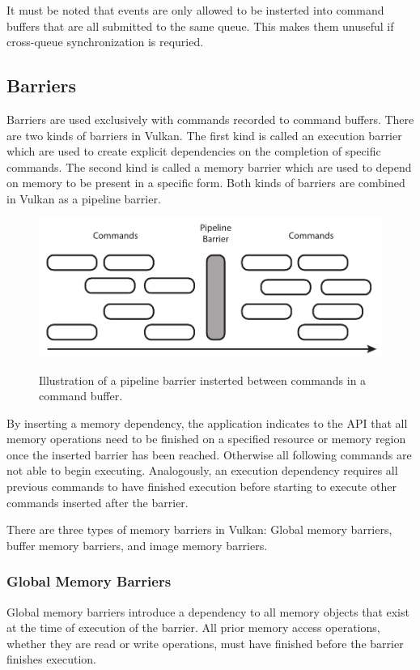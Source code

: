       It must be noted that events are only allowed to be insterted into command buffers that are all submitted to the same queue. This makes them unuseful if cross-queue synchronization is requried.

    \subsection{Barriers}
    \label{sub:Barriers}
      Barriers are used exclusively with commands recorded to command buffers. There are two kinds of barriers in Vulkan. The first kind is called an execution barrier which are used to create explicit dependencies on the completion of specific commands. The second kind is called a memory barrier which are used to depend on memory to be present in a specific form. Both kinds of barriers are combined in Vulkan as a pipeline barrier.

      \begin{figure}
      \caption{Illustration of a pipeline barrier insterted between commands in a command buffer.}
      \centering
      \includegraphics{Main/Images/PipelineBarrier}
      \label{fig:PipelineBarrier}
      \end{figure}

      By inserting a memory dependency, the application indicates to the API that all memory operations need to be finished on a specified resource or memory region once the inserted barrier has been reached. Otherwise all following commands are not able to begin executing. Analogously, an execution dependency requires all previous commands to have finished execution before starting to execute other commands inserted after the barrier.

      There are three types of memory barriers in Vulkan: Global memory barriers, buffer memory barriers, and image memory barriers.

      \subsubsection{Global Memory Barriers}
        Global memory barriers introduce a dependency to all memory objects that exist at the time of execution of the barrier. All prior memory access operations, whether they are read or write operations, must have finished before the barrier finishes execution.

